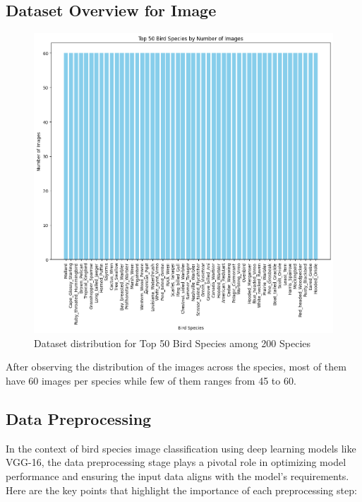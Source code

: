 \subsection{Dataset Overview for Image}
\begin{figure}[h!]
    \centering
    \includegraphics[scale=0.45]{images/cubdataset.png}
    \caption{Dataset distribution for Top 50 Bird Species among 200 Species}
\end{figure}
After observing the distribution of the images across the species, most of them have 60 images per species while few of them ranges from 45 to 60.

\subsection{Data Preprocessing}
In the context of bird species image classification using deep learning models
like VGG-16, the data preprocessing stage plays a pivotal role in optimizing
model performance and ensuring the input data aligns with the model's
requirements. Here are the key points that highlight the importance of each
preprocessing step:


